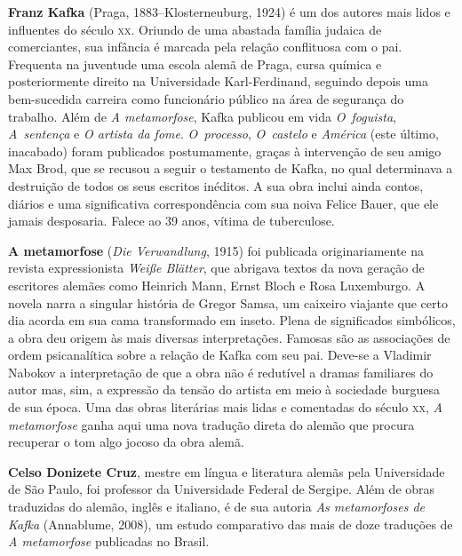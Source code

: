 \textbf{Franz Kafka} (Praga, 1883--Klosterneuburg, 1924) é um dos autores mais lidos 
e influentes do século \textsc{xx}. Oriundo de uma abastada família judaica de
comerciantes, sua infância é marcada pela relação conflituosa com o pai.
Frequenta na juventude uma escola alemã de Praga, cursa química e
posteriormente direito na Universidade Karl{}-Ferdinand, seguindo depois 
uma bem{}-sucedida carreira como funcionário público na área de segurança do trabalho. 
Além de \textit{A metamorfose}, Kafka publicou em vida \textit{O~foguista}, \textit{A~sentença}
e \textit{O artista da fome}. \textit{O~processo}, \textit{O~castelo} e \textit{América} 
(este último, inacabado) foram publicados postumamente, graças à intervenção de 
seu amigo Max Brod, que se recusou a seguir o testamento de Kafka, no qual 
determinava a destruição de todos os seus escritos inéditos. A sua obra inclui
ainda contos, diários e uma significativa correspondência com sua noiva Felice
Bauer, que ele jamais desposaria. Falece ao 39 anos, vítima de tuberculose.

\textbf{A metamorfose} (\textit{Die Verwandlung}, 1915) foi publicada
originariamente na revista expressionista \textit{Weiße Blätter}, que abrigava
textos da nova geração de escritores alemães como Heinrich Mann, Ernst Bloch e
Rosa Luxemburgo. A novela narra a singular história de Gregor Samsa, um caixeiro
viajante que certo dia acorda em sua cama transformado em inseto. Plena de
significados simbólicos, a obra deu origem às mais diversas interpretações.
Famosas são as associações de ordem psicanalítica sobre a relação de Kafka 
com seu pai. Deve{}-se a Vladimir Nabokov a interpretação de que a obra não é
redutível a dramas familiares do autor mas, sim, a expressão da tensão do artista
em meio à sociedade burguesa de sua época. Uma das obras literárias mais lidas e comentadas
do século \textsc{xx}, \textit{A metamorfose} ganha aqui uma nova tradução direta do
alemão que procura recuperar o tom algo jocoso da obra alemã.
        
\textbf{Celso Donizete Cruz}, mestre em língua e literatura alemãs pela Universidade de São Paulo, foi professor da Universidade Federal de Sergipe. Além de obras traduzidas do alemão, inglês e italiano, é de sua autoria \textit{As metamorfoses de Kafka} (Annablume, 2008), um estudo comparativo das mais de doze traduções de \textit{A metamorfose} publicadas no Brasil.
